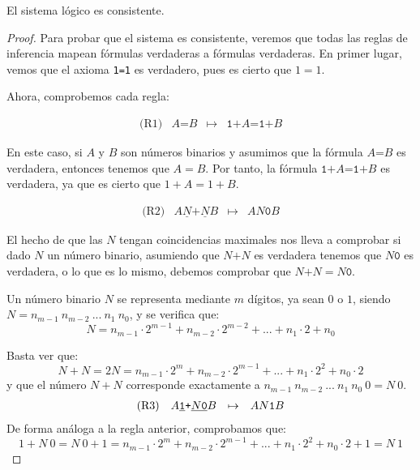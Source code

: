 \pagebreak

\begin{proposicion}\label{prop:ap-cons}
El sistema lógico  es consistente.
\end{proposicion}
\begin{proof}
Para probar que el sistema es consistente, veremos que todas las reglas de inferencia mapean fórmulas verdaderas a fórmulas verdaderas. En primer lugar, vemos que el axioma \texttt{1=1} es verdadero, pues es cierto que $1=1$.

Ahora, comprobemos cada regla:

$$
    \begin{matrix}
    \text{(R1)} & A\texttt{=}B & \mapsto & \texttt{1+}A\texttt{=}\texttt{1+}B 
    \end{matrix}
$$

En este caso, si $A$ y $B$ son números binarios y asumimos que la fórmula $A\texttt{=}B$ es verdadera, entonces tenemos que $A=B$. Por tanto, la fórmula $\texttt{1+}A\texttt{=1+}B$ es verdadera, ya que es cierto que $1+A=1+B$.

$$
    \begin{matrix}
    \text{(R2)} & A\underline{N}\texttt{+}\underline{N}B & \mapsto & AN\texttt{0}B
    \end{matrix}
$$

El hecho de que las $N$ tengan coincidencias maximales nos lleva a comprobar si dado $N$ un número binario, asumiendo que $N\texttt{+}N$ es verdadera tenemos que $N\texttt{0}$ es verdadera, o lo que es lo mismo, debemos comprobar que $N\texttt{+}N=N\texttt{0}$.

Un número binario $N$ se representa mediante $m$ dígitos, ya sean $0$ o $1$, siendo \linebreak $N=n_{m-1}\:n_{m-2}\:...\:n_1\:n_0$, y se verifica que:
$$N = n_{m-1}\cdot2^{m-1} + n_{m-2}\cdot2^{m-2}+...+n_1\cdot2+n_0$$

Basta ver que:
$$N+N=2N=n_{m-1}\cdot2^{m} + n_{m-2}\cdot2^{m-1}+...+n_1\cdot2^2+n_0\cdot 2$$
y que el número $N+N$ corresponde exactamente a $n_{m-1}\:n_{m-2}\:...\:n_1\:n_0\:0=N\:0$.
$$
    \begin{matrix}
    \text{(R3)} & A\texttt{\underline{1}+}\underline{N\texttt{0}}B & \mapsto & AN\texttt{1}B
    \end{matrix}
$$
De forma análoga a la regla anterior, comprobamos que:
$$1+N\:0=N\:0+1=n_{m-1}\cdot2^{m} + n_{m-2}\cdot2^{m-1}+...+n_1\cdot2^2+n_0\cdot 2+1=N\:1$$
\end{proof}

